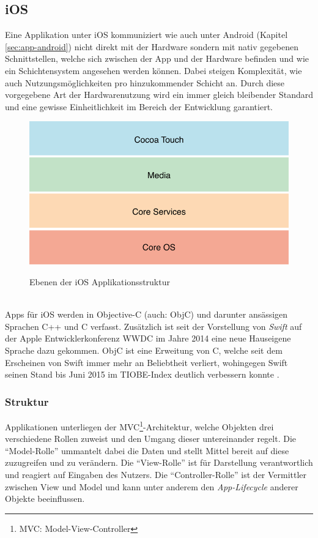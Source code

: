 \subsection{iOS}
	Eine Applikation unter iOS kommuniziert wie auch unter Android (Kapitel
	\ref{sec:app-android}) nicht direkt mit  der Hardware sondern mit nativ
	gegebenen Schnittstellen, welche sich zwischen der App und der Hardware
	befinden und wie ein Schichtensystem angesehen werden können. Dabei steigen
	Komplexität, wie auch Nutzungsmöglichkeiten pro hinzukommender Schicht an.
	Durch diese vorgegebene Art der Hardwarenutzung wird ein immer gleich
	bleibender Standard und eine gewisse Einheitlichkeit im Bereich der Entwicklung
	garantiert.
	\begin{figure}[h]
		\centering
		\includegraphics[width=0.5\linewidth]{ios/media/ios-layers.png}
		\caption{Ebenen der iOS Applikationsstruktur}
		\cite{AboutiOSTech2015}
		\label{fig:marcetshare}
	\end{figure}
	\\
	Apps für iOS werden in Objective-C (auch: ObjC) und darunter ansässigen
	Sprachen C++ und C verfasst. Zusätzlich ist seit der Vorstellung von
	\textsl{Swift} auf der Apple Entwicklerkonferenz WWDC im Jahre 2014 eine
	neue Hauseigene Sprache dazu gekommen. ObjC ist eine Erweitung von C, welche
	seit dem Erscheinen von Swift immer mehr an Beliebtheit verliert, wohingegen
	Swift seinen Stand bis Juni 2015 im TIOBE-Index deutlich verbessern
	konnte \cite{TIOBE062015}.
	\subsubsection{Struktur}
		Applikationen unterliegen der MVC\footnote{MVC:
		Model-View-Controller}-Architektur, welche Objekten drei verschiedene Rollen
		zuweist und den Umgang dieser untereinander regelt. Die "`Model-Rolle"'
		ummantelt dabei die Daten und stellt Mittel bereit auf diese zuzugreifen und
		zu verändern. Die "`View-Rolle"' ist für Darstellung verantwortlich und
		reagiert auf Eingaben des Nutzers. Die "`Controller-Rolle"' ist der
		Vermittler zwischen View und Model und kann unter anderem den
		\textsl{App-Lifecycle} anderer Objekte beeinflussen.
